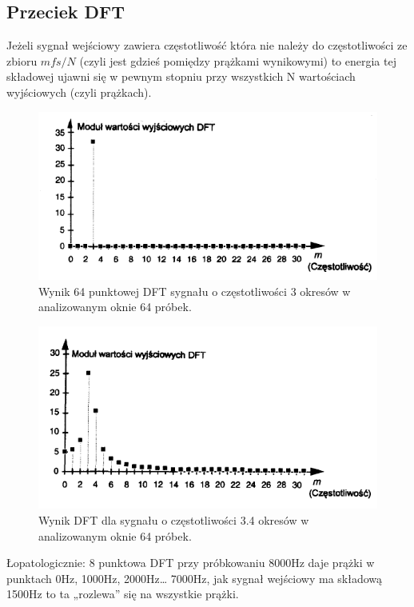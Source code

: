 \documentclass[a4paper,twoside]{report}
\begin{document}
\subsection{Przeciek DFT}
Jeżeli sygnał wejściowy zawiera częstotliwość która nie należy do częstotliwości ze zbioru $ mfs/N $ (czyli jest gdzieś pomiędzy prążkami wynikowymi) to energia tej składowej ujawni się w pewnym stopniu przy wszystkich N wartościach wyjściowych (czyli prążkach).

\begin{figure}[htbp]
	\centering
	\includegraphics[scale=0.7]{obrazy/fourier/3okresy.png}
	\caption{Wynik 64 punktowej DFT sygnału o częstotliwości 3 okresów w analizowanym oknie 64 próbek. }
\end{figure}

\begin{figure}[htbp]
	\centering
	\includegraphics[scale=0.7]{obrazy/fourier/34okresy.png}
	\caption{Wynik DFT dla sygnału o częstotliwości 3.4 okresów w analizowanym oknie 64 próbek. }
\end{figure}

Łopatologicznie: 8 punktowa DFT przy próbkowaniu 8000Hz daje prążki w punktach 0Hz, 1000Hz, 2000Hz… 7000Hz, jak sygnał wejściowy ma składową 1500Hz to ta „rozlewa” się na wszystkie prążki. 
\end{document}
